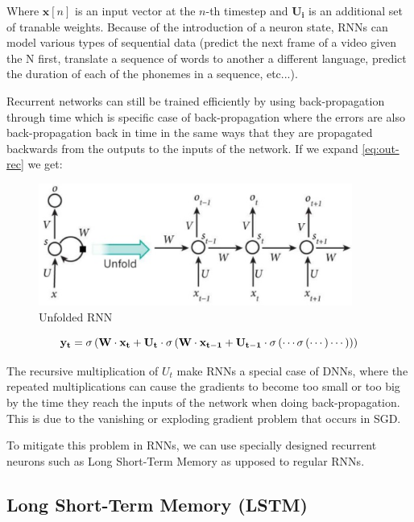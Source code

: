 Where $\mathbf{x}[n]$ is an input vector at the $n$-th timestep and $\mathbf{U_i}$ is an additional set of tranable weights. Because of the introduction of a neuron state, RNNs can model various types of sequential data (predict the next frame of a video given the N first, translate a sequence of words to another a different language, predict the duration of each of the phonemes in a sequence, etc...).

Recurrent networks can still be trained efficiently by using back-propagation through time \cite{werbos1990backpropagation} which is specific case of back-propagation where the errors are also back-propagation back in time in the same ways that they are propagated backwards from the outputs to the inputs of the network. If we expand \ref{eq:out-rec} we get:

\begin{figure}
    \centering
    \includegraphics[height=4cm]{figures/unfold}
    \caption{Unfolded RNN}
    \label{fig:unfold}
\end{figure}

\begin{equation}
    \centering
    \mathbf{y_t} = \sigma \left ( \mathbf{W} \cdot \mathbf{x_t} + \mathbf{U_t} \cdot \sigma \left ( \mathbf{W} \cdot \mathbf{x_{t-1}} + \mathbf{U_{t-1}} \cdot \sigma \left ( \cdots \sigma \left ( \cdots \right ) \cdots \right ) \right ) \right )
    \label{eq:out-rec-expanded}
\end{equation}

The recursive multiplication of $U_t$ make RNNs a special case of DNNs, where the repeated multiplications can cause the gradients to become too small or too big by the time they reach the inputs of the network when doing back-propagation. This is due to the vanishing or exploding gradient problem \cite{bengio1994learning} that occurs in SGD.

To mitigate this problem in RNNs, we can use specially designed recurrent neurons such as Long Short-Term Memory as upposed to regular RNNs.

\subsection{Long Short-Term Memory (LSTM)}

